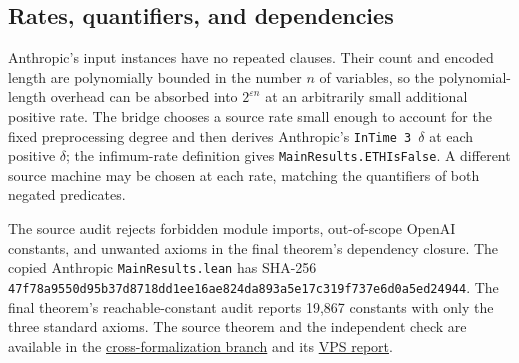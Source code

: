 \documentclass[11pt,letterpaper]{article}
\newcommand{\lean}[1]{\texttt{#1}}
\begin{document}
\subsection{Rates, quantifiers, and dependencies}
Anthropic's input instances have no repeated clauses. Their count and encoded length are polynomially bounded in the number $n$ of variables, so the polynomial-length overhead can be absorbed into $2^{\varepsilon n}$ at an arbitrarily small additional positive rate. The bridge chooses a source rate small enough to account for the fixed preprocessing degree and then derives Anthropic's \lean{InTime 3 $\delta$} at each positive $\delta$; the infimum-rate definition gives \lean{MainResults.ETHIsFalse}. A different source machine may be chosen at each rate, matching the quantifiers of both negated predicates.

The source audit rejects forbidden module imports, out-of-scope OpenAI constants, and unwanted axioms in the final theorem's dependency closure. The copied Anthropic \lean{MainResults.lean} has SHA-256 \lean{47f78a9550d95b37d8718dd1ee16ae824da893a5e17c319f737e6d0a5ed24944}. The final theorem's reachable-constant audit reports 19,867 constants with only the three standard axioms. The source theorem and the independent check are available in the \href{https://github.com/thinkthoughts/math/tree/eth-bridge/rpi-378.3a}{cross-formalization branch} and its \href{https://github.com/thinkthoughts/math/blob/55fdced45/docs/RPI-378.3d_REPORT.md}{VPS report}.
\end{document}
